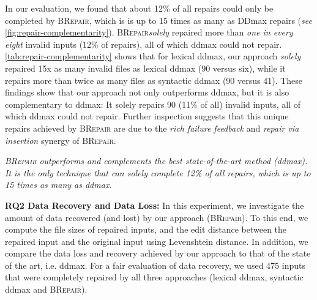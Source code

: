\documentclass[sigconf,review,anonymous]{acmart}
\newenvironment{result}{\begin{framed}\centering\it}{\end{framed}}
\newcommand{\approach}{\textsc{BRepair}\xspace}
\begin{document}
In our evaluation, we found that about 12\% of all repairs could only be completed by \approach, which is is up to 15 times as many as DDmax repairs (\textit{see} \autoref{fig:repair-complementarity}). 
\approach \textit{solely} repaired more than 
\textit{one in every eight} invalid inputs (12\% of repairs), %
all of which ddmax could not repair. %
\autoref{tab:repair-complementarity} shows that for lexical ddmax, our approach \textit{solely} repaired 15x as many invalid files as lexical ddmax (90 versus six), while it repairs more than twice as many files as syntactic ddmax (90 versus 41). 
These findings show that our approach not only outperforms ddmax, but it is also complementary to ddmax: It solely repairs 90 (11\% of all) invalid inputs, all of which ddmax could not repair. %
Further 
inspection suggests that this unique repairs achieved by \approach are due to the \textit{rich failure feedback} and \textit{repair via insertion} synergy of \approach. 



\begin{result}
\approach 
outperforms and complements the best state-of-the-art method (ddmax).
It is the only technique that can solely complete 12\% of all repairs, which is up to 15 times as many as ddmax. 
\end{result}

\noindent
\textbf{RQ2 Data Recovery and Data Loss:} In this experiment, we investigate the amount of data recovered (and lost) by our approach (\approach). To this end, we compute the file sizes of repaired inputs, and the edit distance between the repaired input and the original input using Levenshtein distance. In addition, we compare the data loss and recovery achieved by our approach to that of the state of the art, i.e. ddmax. 
For a fair evaluation of data recovery, we used 475 inputs that were completely repaired by all three approaches (lexical ddmax, syntactic ddmax and \approach). 
\end{document}

